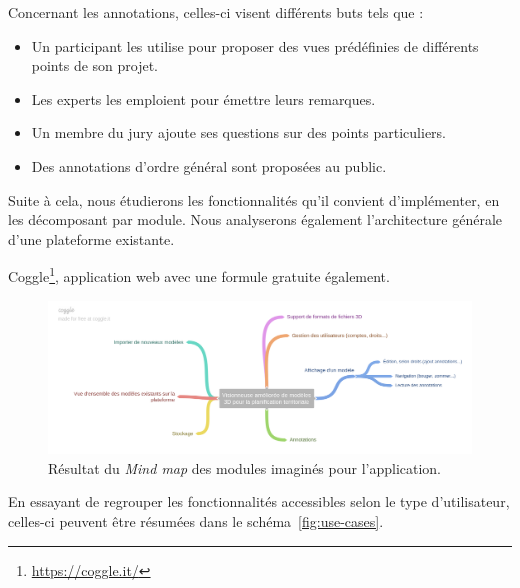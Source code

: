 Concernant les annotations, celles-ci visent différents buts tels que :
\begin{itemize}
    \item Un participant les utilise pour proposer des vues prédéfinies de différents points de son projet.
    \item Les experts les emploient pour émettre leurs remarques.
    \item Un membre du jury ajoute ses questions sur des points particuliers.
    \item Des annotations d'ordre général sont proposées au public.
\end{itemize}


Suite à cela, nous étudierons les fonctionnalités qu'il convient d'implémenter, en les décomposant par module. Nous analyserons également l'architecture générale d'une plateforme existante.

 Coggle\footnote{\url{https://coggle.it/}}, application web avec une formule gratuite également.

\begin{figure}[]
    \centering
    \includegraphics[width=\linewidth]{Figures/mip-viewer-mindmap.png}
    \caption{Résultat du \textit{Mind map} des modules imaginés pour l'application.}
    \label{fig:mip-viewer-mindmap}
\end{figure}

En essayant de regrouper les fonctionnalités accessibles selon le type d'utilisateur, celles-ci peuvent être résumées dans le schéma~\ref{fig:use-cases}.

